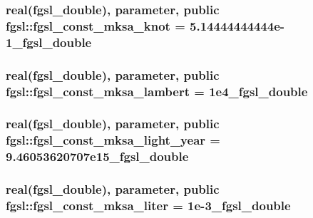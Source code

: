 \subsubsection[{fgsl\+\_\+const\+\_\+mksa\+\_\+knot}]{\setlength{\rightskip}{0pt plus 5cm}real({\bf fgsl\+\_\+double}), parameter, public fgsl\+::fgsl\+\_\+const\+\_\+mksa\+\_\+knot = 5.\+14444444444e-\/1\+\_\+fgsl\+\_\+double}\label{namespacefgsl_a36e83219d4dc03eaba28ee2ee6636c56}
\hypertarget{namespacefgsl_abb530767690eea1cf7e8d6d99141ae41}{}
\subsubsection[{fgsl\+\_\+const\+\_\+mksa\+\_\+lambert}]{\setlength{\rightskip}{0pt plus 5cm}real({\bf fgsl\+\_\+double}), parameter, public fgsl\+::fgsl\+\_\+const\+\_\+mksa\+\_\+lambert = 1e4\+\_\+fgsl\+\_\+double}\label{namespacefgsl_abb530767690eea1cf7e8d6d99141ae41}
\hypertarget{namespacefgsl_ac9efe31fa2e902dc8cced7ce8b82c610}{}
\subsubsection[{fgsl\+\_\+const\+\_\+mksa\+\_\+light\+\_\+year}]{\setlength{\rightskip}{0pt plus 5cm}real({\bf fgsl\+\_\+double}), parameter, public fgsl\+::fgsl\+\_\+const\+\_\+mksa\+\_\+light\+\_\+year = 9.\+46053620707e15\+\_\+fgsl\+\_\+double}\label{namespacefgsl_ac9efe31fa2e902dc8cced7ce8b82c610}
\hypertarget{namespacefgsl_ac989bb9124679e7e571cef06c81e5fe3}{}
\subsubsection[{fgsl\+\_\+const\+\_\+mksa\+\_\+liter}]{\setlength{\rightskip}{0pt plus 5cm}real({\bf fgsl\+\_\+double}), parameter, public fgsl\+::fgsl\+\_\+const\+\_\+mksa\+\_\+liter = 1e-\/3\+\_\+fgsl\+\_\+double}\label{namespacefgsl_ac989bb9124679e7e571cef06c81e5fe3}
\hypertarget{namespacefgsl_a7bb4dd075b4ec4613ff976153a8a42dd}{}
